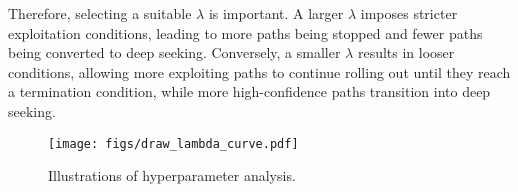 Therefore, selecting a suitable $\lambda$ is important. A larger  $\lambda$ imposes stricter exploitation conditions, leading to more paths being stopped and fewer paths being converted to deep seeking. Conversely, a smaller $\lambda$ results in looser conditions, allowing more exploiting paths to continue rolling out until they reach a termination condition, while more high-confidence paths transition into deep seeking.


\begin{figure}
    \centering
    \texttt{[image: figs/draw\_lambda\_curve.pdf]}
    \caption{Illustrations of hyperparameter analysis. }
    \label{app:fig:lambda_curve}
\end{figure}

\begin{table}
    \centering
    \caption{Hyperparameter $\lambda_\mathrm{es}$ and $\lambda_\mathrm{ds}$ in transition thresholds $\theta_\mathrm{es}$ and $\theta_\mathrm{ds}$. ``ES (Early Stop)~\%'' and ``DS (Deep Seek)~\%'' are the ratios of the node type transition between the exploitation and exploration.  }
    \label{app:tab:hyperparameter}
    \vspace{5pt}
\end{table}








